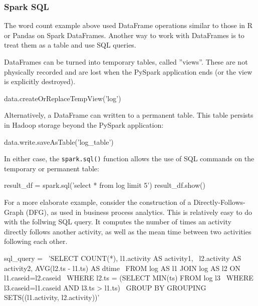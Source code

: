 \begin{withcode}
\subsubsection*{Spark SQL}

The word count example above used DataFrame operations similar to those in R or Pandas on Spark DataFrames. Another way to work with DataFrames is to treat them as a table and use SQL queries.

DataFrames can be turned into temporary tables, called ''views''. These are not physically recorded and are lost when the PySpark application ends (or the view is explicitly destroyed).

\begin{pythoncode}
data.createOrReplaceTempView('log')
\end{pythoncode}

Alternatively, a DataFrame can written to a permanent table. This table persists in Hadoop storage beyond the PySpark application:

\begin{pythoncode}
data.write.saveAsTable('log_table')
\end{pythoncode}

In either case, the \texttt{spark.sql()} function allows the use of SQL commands on the temporary or permanent table:

\begin{pythoncode}
result_df = spark.sql('select * from log limit 5')
result_df.show()
\end{pythoncode}

For a more elaborate example, consider the construction of a Directly-Follows-Graph (DFG), as used in business process analytics. This is relatively easy to do with the follwing SQL query. It computes the number of times an activity directly follows another activity, as well as the mean time between two activities following each other. 

\begin{pythoncode}
sql_query = \
'SELECT COUNT(*), l1.activity AS activity1, \
 l2.activity AS activity2, AVG(l2.ts - l1.ts) AS dtime \
  FROM log AS l1 JOIN log AS l2 ON l1.caseid=l2.caseid \
   WHERE l2.ts = (SELECT MIN(ts) FROM log l3 \
    WHERE l3.caseid=l1.caseid AND l3.ts > l1.ts) \
     GROUP BY GROUPING SETS((l1.activity, l2.activity))'
\end{pythoncode}


\end{withcode}
